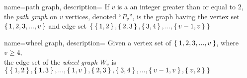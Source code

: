 {
  name={path graph},
  description={%
    If $v$ is a an integer greater than or equal to $2$, the \textsl{path graph}
    on $v$ vertices, denoted ``$P_{v}$'', is the graph having the vertex set
    $\set{1,2,3,...,v}$ and edge set
    $\Set{\set{1,2},\set{2,3},\set{3,4},...,\set{v-1,v}}$%
  }
}

{
  name={wheel graph},
  description={%
    Given a vertex set of $\Set{1,2,3,...,v}$, where $v \ge 4$, \\
    the edge set of the \textsl{wheel graph} $W_{v}$ is
    $\Set{\Set{1,2},\Set{1,3},...,
      \Set{1,v},\Set{2,3},\Set{3,4},...,
      \Set{v-1,v},\Set{v,2}}$%
  }
}
